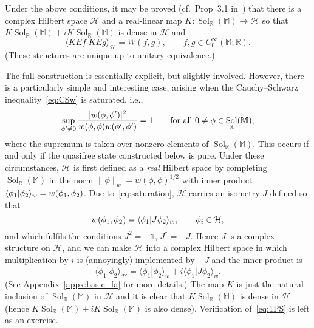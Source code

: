 \documentclass[12pt]{article}
\let\Re\relax
\let\Im\relax
\DeclareMathOperator{\Re}{Re}
\DeclareMathOperator{\Im}{Im}
\newcommand{\1}{\mathds{1}}                         %
\newcommand{\RR}{\mathbb{R}}           %
\newcommand{\MM}{\mathbb{M}}
\newcommand{\HH}{{\mathcal{H}}}
\newcommand{\II}{{\mathbb{1}}}
\newcommand{\CoinX}[1]{C_0^\infty(#1)}
\newcommand{\ip}[2]{\langle #1|#2\rangle}
\DeclareMathOperator{\Sol}{Sol}
\begin{document}
Under the above conditions, it may be proved (cf.~Prop~3.1 in~\cite{KayWald:1991}) that there is a complex Hilbert space $\HH$ and a real-linear map $K:\Sol_\RR(\MM)\to\HH$
so that $K\Sol_\RR(\MM)+iK\Sol_\RR(\MM)$ is dense in $\HH$ and
\begin{equation}\label{eq:1PS}
\ip{KEf}{KEg}_\HH = W(f,g),\qquad f,g\in\CoinX{\MM;\RR}.
\end{equation}
(These structures are unique up to unitary equivalence.)

The full construction is essentially explicit, but slightly involved. However, there is a particularly simple and interesting case, arising when the Cauchy--Schwarz inequality~\eqref{eq:CSw} is saturated, i.e.,
\begin{equation}\label{eq:saturation}
\sup_{\phi'\neq 0}\frac{|\Im w(\phi,\phi')|^2}{w(\phi,\phi)w(\phi',\phi')} = 1 \qquad\text{for all $0\neq \phi\in\Sol_{\RR}(\MM)$},
\end{equation}
where the supremum is taken over nonzero elements of $\Sol_\RR(\MM)$. This occurs if and only if the quasifree state constructed below is pure.
Under these circumstances, 
$\HH$ is first defined as a \emph{real} Hilbert space by completing $\Sol_\RR(\MM)$ in the norm $\|\phi\|_w=w(\phi,\phi)^{1/2}$ with inner product
$\ip{\phi_1}{\phi_2}_w=\Re w(\phi_1,\phi_2)$. 
Due to~\eqref{eq:saturation}, $\HH$ carries an isometry $J$ defined so that
\[
\Im w(\phi_1,\phi_2) = \ip{\phi_1}{J\phi_2}_w, \qquad \phi_i\in \HH,
\]
and which fulfils the conditions $J^2=-\II$, $J^\dagger =-J$. Hence $J$ is a complex structure on $\HH$, and we can make $\HH$ into a complex Hilbert space in which multiplication by $i$ is
(annoyingly) implemented by $-J$ and the inner product is
\[
\ip{\phi_1}{\phi_2}_\HH = \ip{\phi_1}{\phi_2}_w + i \ip{\phi_1}{J\phi_2}_w.
\] 
(See Appendix~\ref{appx:basic_fa} for more details.)
The map $K$ is just the natural inclusion of $\Sol_\RR(\MM)$ in $\HH$ and it is clear that $K\Sol_\RR(\MM)$ is dense in $\HH$ (hence $K\Sol_\RR(\MM)+iK\Sol_\RR(\MM)$ is also dense).
Verification of~\eqref{eq:1PS} is left as an exercise.  
\end{document}
